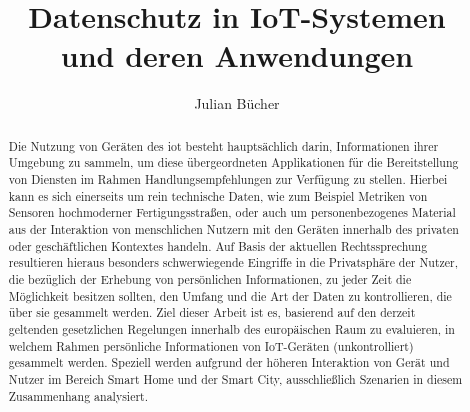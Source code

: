 \documentclass[runningheads]{llncs}
\begin{document}

\title{Datenschutz in IoT-Systemen \\und deren Anwendungen}
%
%
\author{Julian Bücher}
%
%
%
\maketitle              %


\begin{abstract}
Die Nutzung von Geräten des \ac{iot} besteht hauptsächlich darin, Informationen ihrer Umgebung zu sammeln, um diese übergeordneten Applikationen für die Bereitstellung von Diensten im Rahmen Handlungsempfehlungen zur Verfügung zu stellen. Hierbei kann es sich einerseits um rein technische Daten, wie zum Beispiel Metriken von Sensoren hochmoderner Fertigungsstraßen, oder auch um personenbezogenes Material aus der Interaktion von menschlichen Nutzern mit den Geräten innerhalb des privaten oder geschäftlichen Kontextes handeln. Auf Basis der aktuellen Rechtssprechung resultieren hieraus besonders schwerwiegende Eingriffe in die Privatsphäre der Nutzer, die bezüglich der Erhebung von persönlichen Informationen, zu jeder Zeit die Möglichkeit besitzen sollten, den Umfang und die Art der Daten zu kontrollieren, die über sie gesammelt werden. Ziel dieser Arbeit ist es, basierend auf den derzeit geltenden gesetzlichen Regelungen innerhalb des europäischen Raum zu evaluieren, in welchem Rahmen persönliche Informationen von IoT-Geräten (unkontrolliert) gesammelt werden. Speziell werden aufgrund der höheren Interaktion von Gerät und Nutzer im Bereich Smart Home und der Smart City, ausschließlich Szenarien in diesem Zusammenhang analysiert.

\end{abstract}
\end{document}

